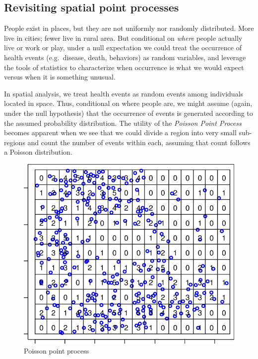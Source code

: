 \documentclass[
]{book}
\begin{document}
\hypertarget{revisiting-spatial-point-processes}{%
\subsection{Revisiting spatial point processes}\label{revisiting-spatial-point-processes}}

People exist in places, but they are not uniformly nor randomly distributed. More live in cities; fewer live in rural area. But conditional on \emph{where} people actually live or work or play, under a null expectation we could treat the occurrence of health events (e.g.~disease, death, behaviors) as random variables, and leverage the tools of statistics to characterize when occurrence is what we would expect versus when it is something unusual.

In spatial analysis, we treat health events as random events among individuals located in space. Thus, conditional on where people are, we might assume (again, under the null hypothesis) that the occurrence of events is generated according to the assumed probability distribution. The utility of the \emph{Poisson Point Process} becomes apparent when we see that we could divide a region into very small sub-regions and count the number of events within each, assuming that count follows a Poisson distribution.

\begin{figure}
\centering
\includegraphics{images/quadrat.png}
\caption{\label{fig:unnamed-chunk-3}Poisson point process}
\end{figure}
\end{document}
